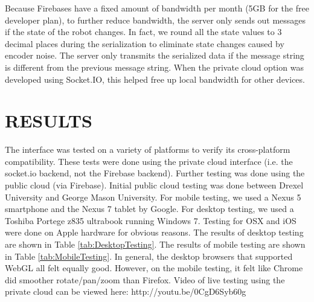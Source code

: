 \documentclass[letterpaper, 10 pt, conference]{ieee/ieeeconf}  %
\begin{document}
Because Firebases have a fixed amount of bandwidth per month (5GB for the free developer plan), to further reduce bandwidth, the server only sends out messages if the state of the robot changes.
In fact, we round all the state values to 3 decimal places during the serialization to eliminate state changes caused by encoder noise.
The server only transmits the serialized data if the message string is different from the previous message string.
When the private cloud option was developed using Socket.IO, this helped free up local bandwidth for other devices.

\section{RESULTS}
The interface was tested on a variety of platforms to verify its cross-platform compatibility.
These tests were done using the private cloud interface (i.e. the socket.io backend, not the Firebase backend).
Further testing was done using the public cloud (via Firebase).
Initial public cloud testing was done between Drexel University and George Mason University.
For mobile testing, we used a Nexus 5 smartphone and the Nexus 7 tablet by Google.
For desktop testing, we used a Toshiba Portege z835 ultrabook running Windows 7.
Testing for OSX and iOS were done on Apple hardware for obvious reasons.
The results of desktop testing are shown in Table \ref{tab:DesktopTesting}.
The results of mobile testing are shown in Table \ref{tab:MobileTesting}.
In general, the desktop browsers that supported WebGL all felt equally good.
However, on the mobile testing, it felt like Chrome did smoother rotate/pan/zoom than Firefox.
Video of live testing using the private cloud can be viewed here: http://youtu.be/0CgD6Syb60g
\end{document}
